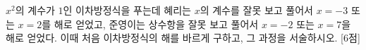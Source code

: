 $x^2$의 계수가 $1$인 이차방정식을 푸는데 혜리는 $x$의 계수를 잘못 보고 풀어서 $x=-3$ 또는 $x=2$를 해로 얻었고, 준영이는 상수항을 잘못 보고 풀어서 $x=-2$ 또는 $x=7$을 해로 얻었다. 이때 처음 이차방정식의 해를 바르게 구하고, 그 과정을 서술하시오. \mbox{[6점]}
